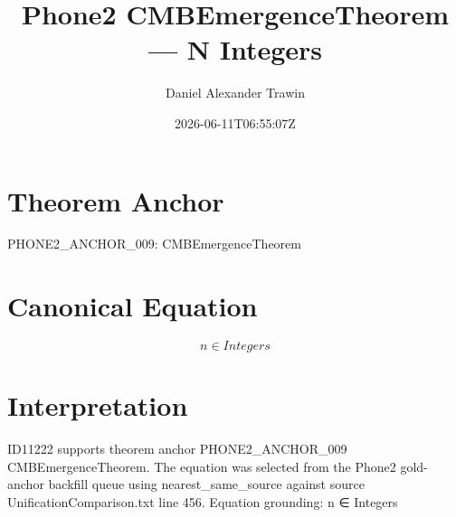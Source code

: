 \documentclass[11pt]{article}
\title{Phone2 CMBEmergenceTheorem — N Integers}
\author{Daniel Alexander Trawin}
\date{2026-06-11T06:55:07Z}
\begin{document}
\maketitle
\section*{Theorem Anchor}
PHONE2_ANCHOR_009: CMBEmergenceTheorem
\section*{Canonical Equation}
\[
n ∈ Integers
\]
\section*{Interpretation}
ID11222 supports theorem anchor PHONE2_ANCHOR_009 CMBEmergenceTheorem. The equation was selected from the Phone2 gold-anchor backfill queue using nearest_same_source against source UnificationComparison.txt line 456. Equation grounding: n ∈ Integers
\end{document}

